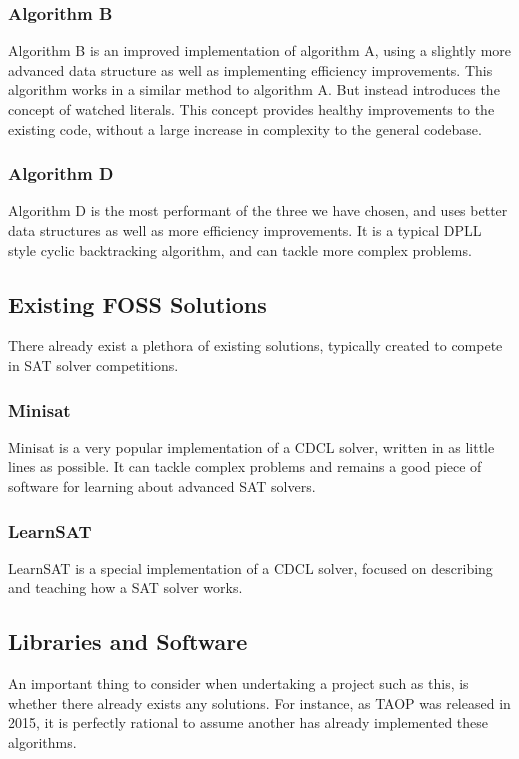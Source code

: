 \documentclass{article}
\begin{document}
\subsubsection{Algorithm B}
Algorithm B is an improved implementation of algorithm A, using a slightly more advanced data structure as well as implementing efficiency improvements.
This algorithm works in a similar method to algorithm A. But instead introduces the concept of watched literals. This concept provides
healthy improvements to the existing code, without a large increase in complexity to the general codebase.

\subsubsection{Algorithm D}
Algorithm D is the most performant of the three we have chosen, and uses better data structures as well as more efficiency improvements. It is a typical
DPLL style cyclic backtracking algorithm, and can tackle more complex problems.

\subsection{Existing FOSS Solutions}
There already exist a plethora of existing solutions, typically created to compete in SAT solver competitions.
\subsubsection{Minisat}
Minisat is a very popular implementation of a CDCL solver, written in as little lines as possible. It can tackle complex problems and remains a good piece
of software for learning about advanced SAT solvers.
\subsubsection{LearnSAT}
LearnSAT is a special implementation of a CDCL solver, focused on describing and teaching how a SAT solver works.

\subsection{Libraries and Software}
An important thing to consider when undertaking a project such as this, is whether there already exists any solutions. For instance, as TAOP
was released in 2015, it is perfectly rational to assume another has already implemented these algorithms.
\end{document}
